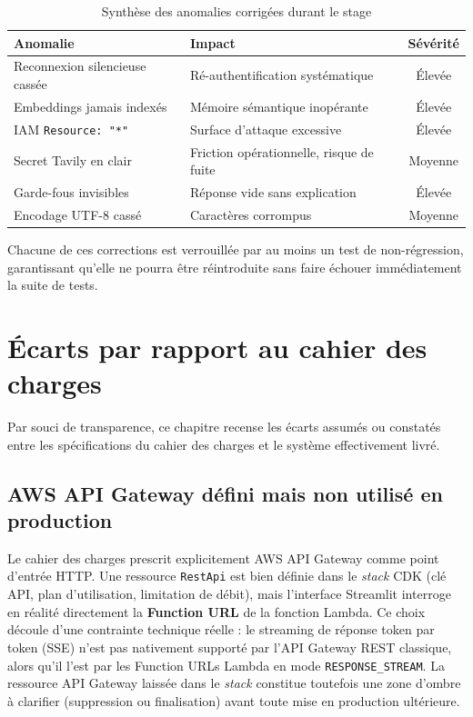 \documentclass[11pt,a4paper]{report}
\begin{document}
\begin{table}[H]
\centering
\caption{Synthèse des anomalies corrigées durant le stage}
\begin{tabularx}{\linewidth}{@{}l Y c@{}}
\toprule
\textbf{Anomalie} & \textbf{Impact} & \textbf{Sévérité} \\
\midrule
Reconnexion silencieuse cassée & Ré-authentification systématique & Élevée \\
Embeddings jamais indexés & Mémoire sémantique inopérante & Élevée \\
IAM \texttt{Resource: "*"} & Surface d'attaque excessive & Élevée \\
Secret Tavily en clair & Friction opérationnelle, risque de fuite & Moyenne \\
Garde-fous invisibles & Réponse vide sans explication & Élevée \\
Encodage UTF-8 cassé & Caractères corrompus & Moyenne \\
\bottomrule
\end{tabularx}
\end{table}

Chacune de ces corrections est verrouillée par au moins un test de
non-régression, garantissant qu'elle ne pourra être réintroduite sans
faire échouer immédiatement la suite de tests.

\chapter{Écarts par rapport au cahier des charges}
\label{chap:ecarts}

Par souci de transparence, ce chapitre recense les écarts assumés ou
constatés entre les spécifications du cahier des charges et le système
effectivement livré.

\section{AWS API Gateway défini mais non utilisé en production}
\label{sec:ecart-apigw}

Le cahier des charges prescrit explicitement AWS API Gateway comme
point d'entrée HTTP. Une ressource \texttt{RestApi} est bien définie
dans le \textit{stack} CDK (clé API, plan d'utilisation, limitation de
débit), mais l'interface Streamlit interroge en réalité directement la
\textbf{Function URL} de la fonction Lambda. Ce choix découle d'une
contrainte technique réelle : le streaming de réponse token par token
(SSE) n'est pas nativement supporté par l'API Gateway REST classique,
alors qu'il l'est par les Function URLs Lambda en mode
\texttt{RESPONSE\_STREAM}. La ressource API Gateway laissée dans le
\textit{stack} constitue toutefois une zone d'ombre à clarifier
(suppression ou finalisation) avant toute mise en production ultérieure.
\end{document}
